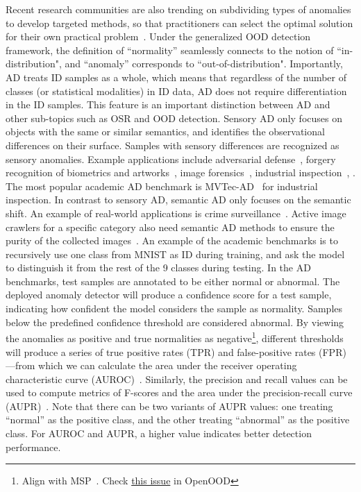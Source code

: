 Recent research communities are also trending on subdividing types of anomalies to develop targeted methods, so that practitioners can select the optimal solution for their own practical problem~.
\smallskip
{}
Under the generalized OOD detection framework, the definition of ``normality'' seamlessly connects to the notion of ``in-distribution", and ``anomaly'' corresponds to ``out-of-distribution".
Importantly, AD treats ID samples as a whole, which means that regardless of the number of classes (or statistical modalities) in ID data, AD does not require differentiation in the ID samples. This feature is an important distinction between AD and other sub-topics such as OSR and OOD detection.
\smallskip
{}
Sensory AD only focuses on objects with the same or similar semantics, and identifies the observational differences on their surface. Samples with sensory differences are recognized as sensory anomalies. 
Example applications include adversarial defense~, forgery recognition of biometrics and artworks~, image forensics~, industrial inspection~, \etc.
The most popular academic AD benchmark is MVTec-AD~ for industrial inspection.
In contrast to sensory AD, semantic AD only focuses on the semantic shift. 
An example of real-world applications is crime surveillance~.
Active image crawlers for a specific category also need semantic AD methods to ensure the purity of the collected images~.
An example of the academic benchmarks is to recursively use one class from MNIST as ID during training, and ask the model to distinguish it from the rest of the 9 classes during testing.
\smallskip
{}
In the AD benchmarks, test samples are annotated to be either normal or abnormal. 
The deployed anomaly detector will produce a confidence score for a test sample, indicating how confident the model considers the sample as normality.
Samples below the predefined confidence threshold are considered abnormal.
By viewing the anomalies as positive and
true normalities as negative\footnote{Align with MSP~. Check \href{https://github.com/Jingkang50/OpenOOD/issues/206}{this issue} in OpenOOD}, different thresholds will produce a series of true positive rates (TPR) and false-positive rates (FPR)---from which we can calculate the area under the receiver operating characteristic curve (AUROC)~. Similarly, the precision and recall values can be used to compute metrics of F-scores and the area under the precision-recall curve (AUPR)~.
Note that there can be two variants of AUPR values: one treating ``normal'' as the positive class, and the other treating ``abnormal'' as the positive class. For AUROC and AUPR, a higher value indicates better detection performance.
